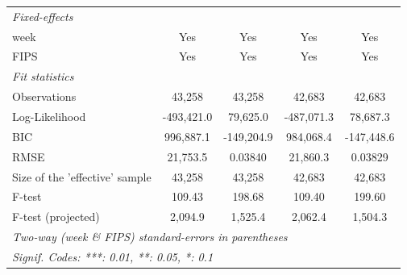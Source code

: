 \documentclass[12pt,a4]{article}
\begin{document}
\begin{landscape}
\begin{table}
\begin{tabular}{lcccc}
  \midrule \emph{Fixed-effects}&   &   &   &  \\
  week & Yes & Yes & Yes & Yes\\
  FIPS & Yes & Yes & Yes & Yes\\
  \midrule \emph{Fit statistics}&  & & & \\
  Observations & 43,258&43,258&42,683&42,683\\
  Log-Likelihood & -493,421.0&79,625.0&-487,071.3&78,687.3\\
  BIC & 996,887.1&-149,204.9&984,068.4&-147,448.6\\
  RMSE & 21,753.5&0.03840&21,860.3&0.03829\\
  Size of the 'effective' sample & 43,258&43,258&42,683&42,683\\
  F-test & 109.43&198.68&109.40&199.60\\
  F-test (projected) & 2,094.9&1,525.4&2,062.4&1,504.3\\
  \midrule\midrule\multicolumn{5}{l}{\emph{Two-way (week \& FIPS) standard-errors in parentheses}}\\
  \multicolumn{5}{l}{\emph{Signif. Codes: ***: 0.01, **: 0.05, *: 0.1}}\\
  \end{tabular}
\end{table}
\end{landscape}
\end{document}
